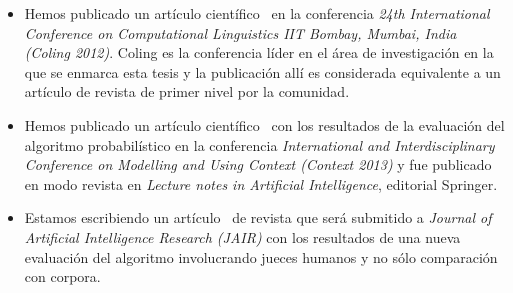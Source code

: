 \begin{itemize}
\item Hemos publicado un art\'iculo cient\'ifico~\cite{arec:2012:coling12} en la conferencia \emph{24th International Conference on Computational Linguistics IIT Bombay, Mumbai, India (Coling 2012)}. Coling es la conferencia l\'ider en el \'area de investigaci\'on en la que se enmarca esta tesis y la publicaci\'on all\'i es considerada equivalente a un art\'iculo de revista de primer nivel por la comunidad. 
\item Hemos publicado un art\'iculo cient\'ifico~\cite{benotti-altamirano-context2013} con los resultados de la evaluaci\'on del algoritmo probabil\'istico en la conferencia \emph{International and Interdisciplinary Conference on Modelling and Using Context (Context 2013)} y fue publicado en modo revista en \emph{Lecture notes in Artificial Intelligence}, editorial Springer. 
\item Estamos escribiendo un art\'iculo~\cite{benotti-altamirano-jair} de revista que ser\'a submitido a \emph{Journal of Artificial Intelligence Research (JAIR)} con los resultados de una nueva evaluaci\'on del algoritmo involucrando jueces humanos y no s\'olo comparaci\'on con corpora.
\end{itemize}

